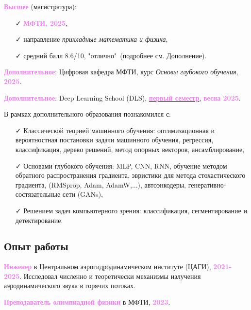 \documentclass[a4paper,12pt]{article}
\begin{document}
	\textcolor{violet}{\textbf{Высшее}} (магистратура):
	\begin{itemize}
		\item[\faCheck] \textcolor{violet}{\textbf{МФТИ, 2025}},
		\item[\faCheck] направление \textit{прикладные математика и физика}, 
		\item[\faCheck] средний балл 8.6/10, "отлично"\ (подробнее см. Дополнение).
	\end{itemize}
	
	\textcolor{violet}{\textbf{Дополнительное}}: Цифровая кафедра МФТИ, курс \textit{Основы глубокого обучения}, \textcolor{violet}{\textbf{2025}}.
	
	\textcolor{violet}{\textbf{Дополнительное}}: Deep Learning School (DLS), \href{https://stepik.org/course/230362/syllabus}{\textcolor{violet}{\textbf{первый семестр}}}, \textcolor{violet}{\textbf{весна 2025}}.
	
	В рамках дополнительного образования познакомился с: 
	\begin{itemize}
		\item[\faCheck] Классической теорией машинного обучения: оптимизационная и вероятностная постановки задачи машинного обучения, регрессия, классификация, дерево решений, метод опорных векторов, ансамблирование,
		\item[\faCheck] Основами глубокого обучения: MLP, CNN, RNN, обучение методом обратного распространения градиента, эвристики для метода стохастического градиента, (RMSprop, Adam, AdamW,...), автоэнкодеры, генеративно-состязательные сети (GANs),
		\item[\faCheck] Решением задач компьютерного зрения: классификация, сегментирование и детектирование.
	\end{itemize}
	
	\subsection*{Опыт работы}
	
	\textcolor{violet}{\textbf{Инженер}} в Центральном аэрогидродинамическом институте (ЦАГИ), \textcolor{violet}{\textbf{2021-2025}}. Исследовал численно и теоретически механизмы излучения аэродинамического звука в горячих потоках.
	
	
	\textcolor{violet}{\textbf{Преподаватель олимпиадной физики}} в МФТИ, \textcolor{violet}{\textbf{2023}}. 
	
\end{document}
